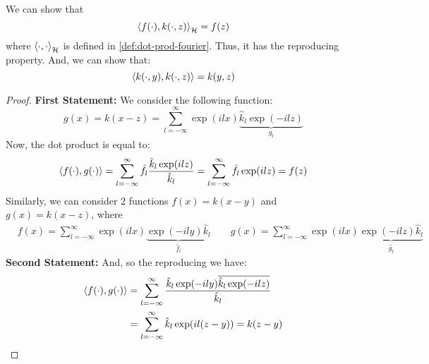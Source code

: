 \begin{proposition}
    \label{prop:fourier-reproducing}
    We can show that 
    \begin{equation*}
        \left\langle f(\cdot), k(\cdot, z) \right\rangle_\mathcal{H} = f(z) 
    \end{equation*}
    where $\left\langle \cdot, \cdot \right\rangle_\mathcal{H}$ is defined in \ref{def:dot-prod-fourier}. Thus, it has the reproducing property. And, we can show that:
    \begin{equation*}
        \left\langle k(\cdot, y), k(\cdot, z) \right\rangle = k(y, z)
    \end{equation*}
\end{proposition}
\begin{proof}
    \textbf{First Statement: } We consider the following function:
    \begin{equation*}
        g(x) = k(x-z) = \sum^\infty_{l=-\infty} \exp(ilx)\underbrace{\hat{k}_l\exp(-ilz)}_{g_l}
    \end{equation*}
    Now, the dot product is equal to:
    \begin{equation*}
        \left\langle f(\cdot), g(\cdot) \right\rangle = \sum^\infty_{l=-\infty} \hat{f}_l\frac{\hat{k}_l\exp(ilz)}{\hat{k}_l} = \sum^\infty_{l=-\infty} \hat{f}_l\exp(ilz) = f(z)
    \end{equation*}
    Similarly, we can consider $2$ functions $f(x) = k(x-y)$ and $g(x) = k(x-z)$, where 
    \begin{equation*}
    \begin{aligned}
        &f(x) = \sum^\infty_{l=-\infty} \exp(ilx)\underbrace{\exp(-ily)\hat{k}_l}_{\hat{f}_l}
        \qquad g(x) = \sum^\infty_{l=-\infty} \exp(ilx)\underbrace{\exp(-ilz)\hat{k}_l}_{\hat{g}_l}
    \end{aligned}
    \end{equation*}
    \textbf{Second Statement: } And, so the reproducing we have:
    \begin{equation*}
    \begin{aligned}
        \left\langle f(\cdot), g(\cdot) \right\rangle &= \sum^\infty_{l=-\infty}\frac{\hat{k}_l\exp(-ily)\overline{\hat{k}_l \exp(-ilz)} }{\hat{k}_l} \\
        &= \sum^\infty_{l=-\infty} \hat{k}_l\exp(il(z-y)) = k(z-y)
    \end{aligned}
    \end{equation*}
\end{proof}

